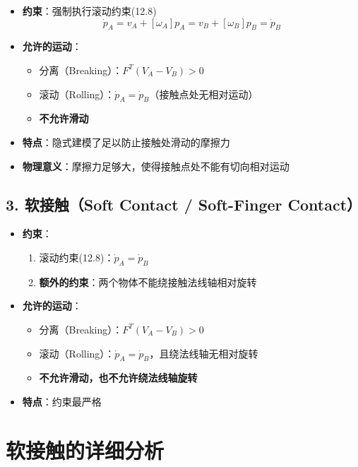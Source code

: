 \documentclass[12pt,a4paper]{article}
\begin{document}
\begin{itemize}
\item \textbf{约束}：强制执行滚动约束(12.8)
  \begin{equation}
  \dot{p}_A = v_A + [\omega_A]p_A = v_B + [\omega_B]p_B = \dot{p}_B
  \end{equation}
\item \textbf{允许的运动}：
  \begin{itemize}
  \item 分离（Breaking）：$F^T (V_A - V_B) > 0$
  \item 滚动（Rolling）：$\dot{p}_A = \dot{p}_B$（接触点处无相对运动）
  \item \textbf{不允许滑动}
  \end{itemize}
\item \textbf{特点}：隐式建模了足以防止接触处滑动的摩擦力
\item \textbf{物理意义}：摩擦力足够大，使得接触点处不能有切向相对运动
\end{itemize}

\subsection{3. 软接触（Soft Contact / Soft-Finger Contact）}

\begin{itemize}
\item \textbf{约束}：
  \begin{enumerate}
  \item 滚动约束(12.8)：$\dot{p}_A = \dot{p}_B$
  \item \textbf{额外的约束}：两个物体不能绕接触法线轴相对旋转
  \end{enumerate}
\item \textbf{允许的运动}：
  \begin{itemize}
  \item 分离（Breaking）：$F^T (V_A - V_B) > 0$
  \item 滚动（Rolling）：$\dot{p}_A = \dot{p}_B$，且绕法线轴无相对旋转
  \item \textbf{不允许滑动，也不允许绕法线轴旋转}
  \end{itemize}
\item \textbf{特点}：约束最严格
\end{itemize}

\section{软接触的详细分析}
\end{document}
